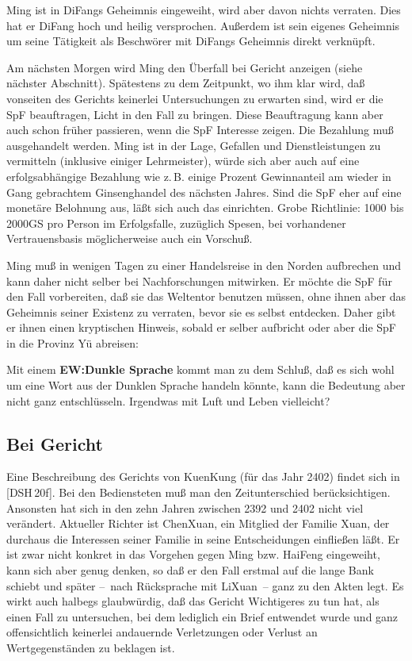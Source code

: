 \documentclass[
a4paper,
twoside,
DIV=calc,
BCOR=4mm,
fontsize=9pt,
twocolumn=on,
titlepage=on,
parskip=half
]{scrartcl}
\begin{document}
Ming ist in DiFangs Geheimnis eingeweiht, wird aber davon nichts
verraten. Dies hat er DiFang hoch und heilig versprochen. Außerdem ist
sein eigenes Geheimnis um seine Tätigkeit als Beschwörer mit DiFangs
Geheimnis direkt verknüpft.

Am nächsten Morgen wird Ming den Überfall bei Gericht anzeigen (siehe
nächster Abschnitt). Spätestens zu dem Zeitpunkt, wo ihm klar wird,
daß vonseiten des Gerichts keinerlei Untersuchungen zu erwarten sind,
wird er die SpF beauftragen, Licht in den Fall zu bringen. Diese
Beauftragung kann aber auch schon früher passieren, wenn die SpF
Interesse zeigen. Die Bezahlung muß ausgehandelt werden. Ming ist in
der Lage, Gefallen und Dienstleistungen zu vermitteln (inklusive
einiger Lehrmeister), würde sich aber auch auf eine erfolgsabhängige
Bezahlung wie z.\,B. einige Prozent Gewinnanteil am wieder in Gang
gebrachtem Ginsenghandel des nächsten Jahres. Sind die SpF eher auf
eine monetäre Belohnung aus, läßt sich auch das einrichten.  Grobe
Richtlinie: 1000 bis 2000GS pro Person im Erfolgsfalle, zuzüglich
Spesen, bei vorhandener Vertrauensbasis möglicherweise auch ein
Vorschuß.

Ming muß in wenigen Tagen zu einer Handelsreise in den Norden
aufbrechen und kann daher nicht selber bei Nachforschungen
mitwirken. Er möchte die SpF für den Fall vorbereiten, daß sie das
Weltentor benutzen müssen, ohne ihnen aber das Geheimnis seiner
Existenz zu verraten, bevor sie es selbst entdecken. Daher gibt er
ihnen einen kryptischen Hinweis, sobald er selber aufbricht oder aber
die SpF in die Provinz Yü abreisen:


Mit einem \textbf{EW:Dunkle Sprache} kommt man zu dem Schluß, daß es
sich wohl um eine Wort aus der Dunklen Sprache handeln könnte, kann
die Bedeutung aber nicht ganz entschlüsseln. Irgendwas mit Luft und
Leben vielleicht?

\subsection{Bei Gericht}

Eine Beschreibung des Gerichts von KuenKung (für das Jahr 2402) findet
sich in [DSH\,20f]. Bei den Bediensteten muß man den Zeitunterschied
berücksichtigen. Ansonsten hat sich in den zehn Jahren zwischen 2392
und 2402 nicht viel verändert. Aktueller Richter ist ChenXuan, ein
Mitglied der Familie Xuan, der durchaus die Interessen seiner Familie
in seine Entscheidungen einfließen läßt. Er ist zwar nicht konkret in
das Vorgehen gegen Ming bzw. HaiFeng eingeweiht, kann sich aber genug
denken, so daß er den Fall erstmal auf die lange Bank schiebt und
später --~nach Rücksprache mit LiXuan~-- ganz zu den Akten legt. Es
wirkt auch halbegs glaubwürdig, daß das Gericht Wichtigeres zu tun
hat, als einen Fall zu untersuchen, bei dem lediglich ein Brief
entwendet wurde und ganz offensichtlich keinerlei andauernde
Verletzungen oder Verlust an Wertgegenständen zu beklagen ist.
\end{document}
